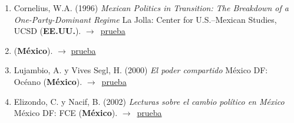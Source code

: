 \documentclass[12 pt, letter]{article}
\newenvironment{CitasMiTrabajo}{
    \begin{footnotesize}
    \begin{enumerate}[label={\footnotesize\emph{cita~\arabic*}},ref=\arabic*] %
        \setlength{\itemsep}{.1\itemsep}
        \setlength{\parskip}{.1\parskip}
    }{\end{enumerate}\end{footnotesize}}
\begin{document}

        \begin{CitasMiTrabajo}

        \item Cornelius, W.A. (1996)
        \emph{Mexican Politics in Transition: The Breakdown of a One-Party-Dominant Regime}
        La Jolla: Center for U.S.--Mexican Studies, UCSD (\textbf{EE.UU.}). $\rightarrow$~\href{http://ericmagar.com/cv/cites/tesisItam/corneliusMPIT.pdf}{prueba}

        \item {} (\textbf{M\'exico}). $\rightarrow$ \href{http://ericmagar.com/cv/cites/tesisItam/deremesYuxtap1999pyg.pdf}{prueba}

        \item Lujambio, A. y Vives Segl, H. (2000)
        \emph{El poder compartido}
        M\'exico DF: Oc\'eano (\textbf{M\'exico}). $\rightarrow$~\href{http://ericmagar.com/cv/cites/tesisItam/LujambioVivesPC.pdf}{prueba}

        \item Elizondo, C. y Nacif, B. (2002)
        \emph{Lecturas sobre el cambio pol\'itico en M\'exico}
        M\'exico DF: FCE (\textbf{M\'exico}). $\rightarrow$~\href{http://ericmagar.com/cv/cites/tesisItam/elizNacif.pdf}{prueba}


        \label{ncites:magar.1994} %

        \end{CitasMiTrabajo}
\end{document}
